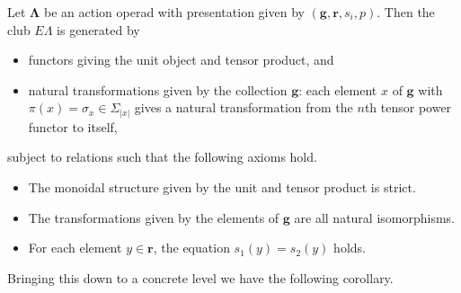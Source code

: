 \documentclass{amsbook} %
\newcommand{\mb}{\mathbf}
\numberwithin{section}{chapter}
\begin{document}
\begin{thm}\label{pres1}
Let $\mb{\Lambda}$ be an action operad with presentation given by $(\mathbf{g},\mathbf{r}, s_{i}, p)$.  Then the club $E\Lambda$ is generated by
\begin{itemize}
\item functors giving the unit object and tensor product, and
\item natural transformations given by the collection $\mathbf{g}$:  each element $x$ of $\mathbf{g}$ with $\pi(x) = \sigma_{x} \in \Sigma_{|x|}$ gives a natural transformation from the $n$th tensor power functor to itself,
\end{itemize}
subject to relations such that the following axioms hold.
\begin{itemize}
\item The monoidal structure given by the unit and tensor product is strict.
\item The transformations given by the elements of $\mathbf{g}$ are all natural isomorphisms.
\item For each element $y \in \mathbf{r}$, the equation $s_{1}(y) = s_{2}(y)$ holds.
\end{itemize}
\end{thm}

Bringing this down to a concrete level we have the following corollary.
\end{document}
